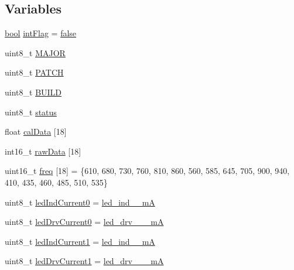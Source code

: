 \subsection*{Variables}
\begin{DoxyCompactItemize}
\item 
\hyperlink{stdbool_8h_abb452686968e48b67397da5f97445f5b}{bool} \hyperlink{Due__AS7265X__Spectrometer_8ino_a7b074219f5f6b80d857f46161612384a}{int\-Flag} = \hyperlink{stdbool_8h_a65e9886d74aaee76545e83dd09011727}{false}
\item 
uint8\-\_\-t \hyperlink{Due__AS7265X__Spectrometer_8ino_ae7b332d6591ae481f983a91ddd5f94b0}{M\-A\-J\-O\-R}
\item 
uint8\-\_\-t \hyperlink{Due__AS7265X__Spectrometer_8ino_aa2fc9067222815bec88b0dc6048b2956}{P\-A\-T\-C\-H}
\item 
uint8\-\_\-t \hyperlink{Due__AS7265X__Spectrometer_8ino_a65db77aa3403b8f451d1d2faa32fde5e}{B\-U\-I\-L\-D}
\item 
uint8\-\_\-t \hyperlink{Due__AS7265X__Spectrometer_8ino_ade818037fd6c985038ff29656089758d}{status}
\item 
float \hyperlink{Due__AS7265X__Spectrometer_8ino_aff70aaa7c9c08aa0348aabb883ab7cf6}{cal\-Data} \mbox{[}18\mbox{]}
\item 
int16\-\_\-t \hyperlink{Due__AS7265X__Spectrometer_8ino_af6e2f1dfc29718525a2a4766430c5227}{raw\-Data} \mbox{[}18\mbox{]}
\item 
uint16\-\_\-t \hyperlink{Due__AS7265X__Spectrometer_8ino_abbc4085ba884ad35981bb755f611e65c}{freq} \mbox{[}18\mbox{]} = \{610, 680, 730, 760, 810, 860, 560, 585, 645, 705, 900, 940, 410, 435, 460, 485, 510, 535\}
\item 
uint8\-\_\-t \hyperlink{Due__AS7265X__Spectrometer_8ino_a90814a030f3017e333317703ebe0a2fb}{led\-Ind\-Current0} = \hyperlink{AS7265X_8h_a67dbe46dbd778ab6f85e0506a2a5121b}{led\-\_\-ind\-\_\-\_\-m\-A}
\item 
uint8\-\_\-t \hyperlink{Due__AS7265X__Spectrometer_8ino_a0277f8794bf73762d1e0a73d60d8fd1b}{led\-Drv\-Current0} = \hyperlink{AS7265X_8h_a56ef4b37340d832f0785fbcee8f9075e}{led\-\_\-drv\-\_\-\_\-\_\-m\-A}
\item 
uint8\-\_\-t \hyperlink{Due__AS7265X__Spectrometer_8ino_ad4229c164ce1698424e3dce8159b6014}{led\-Ind\-Current1} = \hyperlink{AS7265X_8h_a67dbe46dbd778ab6f85e0506a2a5121b}{led\-\_\-ind\-\_\-\_\-m\-A}
\item 
uint8\-\_\-t \hyperlink{Due__AS7265X__Spectrometer_8ino_a1402ba7b3c066ee31c4413767f5eda42}{led\-Drv\-Current1} = \hyperlink{AS7265X_8h_a56ef4b37340d832f0785fbcee8f9075e}{led\-\_\-drv\-\_\-\_\-\_\-m\-A}

\end{DoxyCompactItemize}

